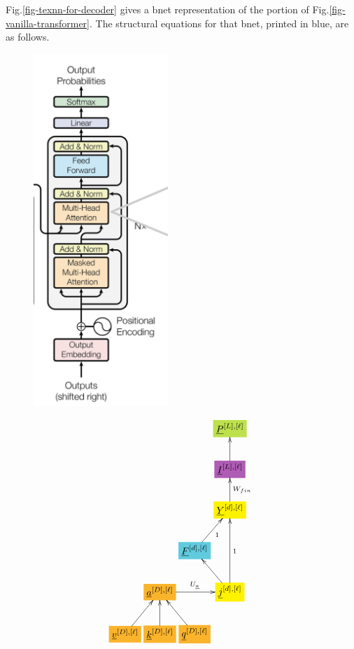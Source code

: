 Fig.\ref{fig-texnn-for-decoder}
gives a
bnet representation of
the 
portion of Fig.\ref{fig-vanilla-transformer}.
The structural equations for that bnet,
printed in blue, are as follows.

\begin{figure}[h!]\centering
\begin{minipage}{.4\linewidth}
\includegraphics[width=2in]{transformer/decoder.jpg}
\end{minipage}%
\begin{minipage}{.6\linewidth}
$$\xymatrix@R=2pc@C=0.2pc{
&&&*+[F*:SpringGreen]{\underline{P}^{[L],[\ell]}}
\\
&&&*+[F*:Orchid]{\underline{I}^{[L],[\ell]}}\ar[u]
\\
&&&*+[F*:yellow]{\underline{Y}^{[d], [\ell]}}\ar[u]_{W_{fin}}
\\
&&*+[F*:SkyBlue]{\underline{F}^{[d], [\ell]}}\ar[ur]_{1}&
\\
&*+[F*:Dandelion]{\underline{a}^{[D],[\ell]}}\ar[rr]^{U_\rva}&&*+[F*:yellow]{\underline{j}^{[d], [\ell]}}\ar[ul]\ar[uu]_{1}
\\
*+[F*:Dandelion]{\underline{v}^{[D], [\ell]}}\ar[ur]&*+[F*:Dandelion]{\underline{k}^{[D], [\ell]}}\ar[u]&*+[F*:Dandelion]{\underline{q}^{[D], [\ell]}}\ar[ul]&
\\
}$$
\end{minipage}
\end{figure}
